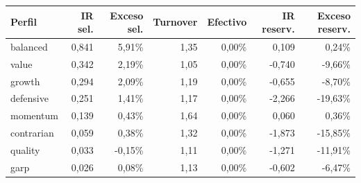 \begin{tabular}{lrrrrrr}
\toprule
Perfil & IR sel. & Exceso sel. & Turnover & Efectivo & IR reserv. & Exceso reserv. \\
\midrule
balanced & 0,841 & 5,91\% & 1,35 & 0,00\% & 0,109 & 0,24\% \\
value & 0,342 & 2,19\% & 1,05 & 0,00\% & -0,740 & -9,66\% \\
growth & 0,294 & 2,09\% & 1,19 & 0,00\% & -0,655 & -8,70\% \\
defensive & 0,251 & 1,41\% & 1,17 & 0,00\% & -2,266 & -19,63\% \\
momentum & 0,139 & 0,43\% & 1,64 & 0,00\% & 0,060 & 0,36\% \\
contrarian & 0,059 & 0,38\% & 1,32 & 0,00\% & -1,873 & -15,85\% \\
quality & 0,033 & -0,15\% & 1,11 & 0,00\% & -1,271 & -11,91\% \\
garp & 0,026 & 0,08\% & 1,13 & 0,00\% & -0,602 & -6,47\% \\
\bottomrule
\end{tabular}
